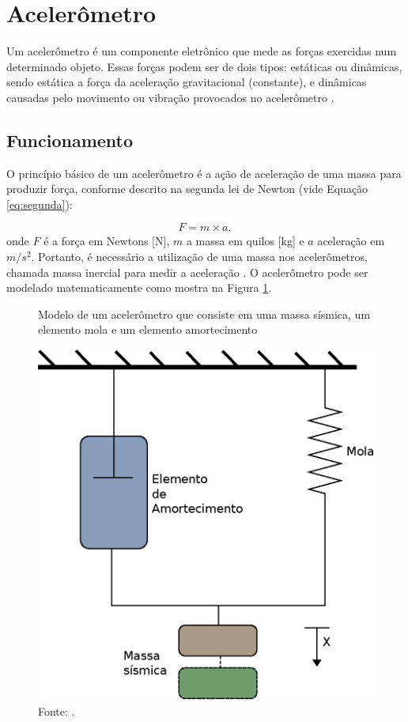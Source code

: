 \section{Acelerômetro}		
	Um acelerômetro é um componente eletrônico que mede as forças exercidas num determinado objeto.  Essas forças podem ser de 
	dois tipos: estáticas ou dinâmicas, sendo estática a força da aceleração gravitacional (constante), e dinâmicas 
	causadas pelo movimento ou vibração provocados no acelerômetro \cite[p. 20]{LISBOA}.

	
	\subsection{Funcionamento}
	O princípio básico de um acelerômetro é a ação de aceleração de uma massa para produzir força, conforme descrito na 
	segunda lei de Newton (vide Equação \ref{eq:segunda}):

	\begin{equation}
		F = m \times a,
		\label{eq:segunda}
	\end{equation}
	onde $F$ é a força em Newtons [N], $m$ a massa em quilos [kg] e $a$ aceleração em $m/{s^2}$. Portanto, é necessário a utilização de uma massa nos acelerômetros, chamada massa inercial para medir a aceleração \cite[p. 271]{INSTRUME}. O acelerômetro pode ser modelado matematicamente como mostra na Figura \ref{fig:modeloAcc}.\\	 

		\begin{figure}[H]
		\vspace{4mm}
		\centering
		\caption{Modelo de um acelerômetro que consiste em uma massa sísmica, um elemento mola e um elemento amortecimento}		
		\label{fig:modeloAcc}	
		\includegraphics[scale=0.7]{imagens/massamola.eps}
		\caption*{Fonte: .}
		\end{figure}
	
